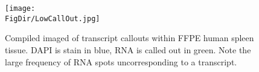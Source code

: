 \begin{figure}
  \centerline{\texttt{[image: \\FigDir/LowCallOut.jpg]}}
  \caption{Compiled imaged of transcript callouts within FFPE human spleen tissue. DAPI is stain in blue, RNA is called out in green. Note the large frequency of RNA spots uncorresponding to a transcript.}
\label{fig:LowCallOut}
\end{figure}